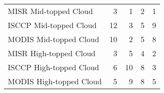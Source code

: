 \begin{tabular}{lrrrr}
   MISR Mid-topped Cloud &                        3 &                        1 &                        2 &                        1 \\
  ISCCP Mid-topped Cloud &                       12 &                        3 &                        5 &                        9 \\
  MODIS Mid-topped Cloud &                       10 &                        2 &                        5 &                        8 \\
  MISR High-topped Cloud &                        3 &                        5 &                        4 &                        2 \\
 ISCCP High-topped Cloud &                        6 &                       10 &                        8 &                        3 \\
 MODIS High-topped Cloud &                        5 &                        9 &                        8 &                        5 \\ \hline
\end{tabular}
